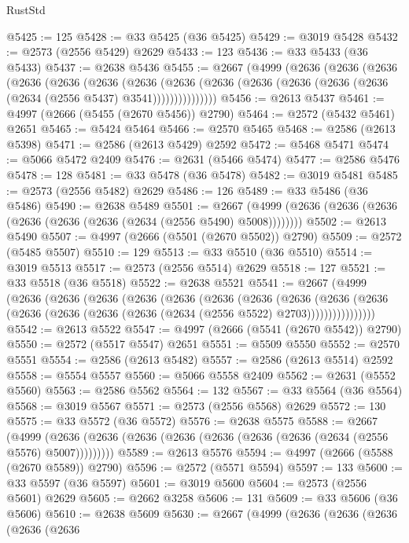 \begin{lexlean}{RustStd}
\begin{coremodule}
@5425 := 125
@5428 := @33 @5425 (@36 @5425)
@5429 := @3019 @5428
@5432 := @2573 (@2556 @5429) @2629
@5433 := 123
@5436 := @33 @5433 (@36 @5433)
@5437 := @2638 @5436
@5455 := @2667
    (@4999
      (@2636
        (@2636
          (@2636
            (@2636
              (@2636
                (@2636
                  (@2636
                    (@2636
                      (@2636 (@2636 (@2636 (@2636 (@2636 (@2634 (@2556 @5437) @3541)))))))))))))))
@5456 := @2613 @5437
@5461 := @4997 (@2666 (@5455 (@2670 @5456)) @2790)
@5464 := @2572 (@5432 @5461) @2651
@5465 := @5424 @5464
@5466 := @2570 @5465
@5468 := @2586 (@2613 @5398)
@5471 := @2586 (@2613 @5429) @2592
@5472 := @5468 @5471
@5474 := @5066 @5472 @2409
@5476 := @2631 (@5466 @5474)
@5477 := @2586 @5476
@5478 := 128
@5481 := @33 @5478 (@36 @5478)
@5482 := @3019 @5481
@5485 := @2573 (@2556 @5482) @2629
@5486 := 126
@5489 := @33 @5486 (@36 @5486)
@5490 := @2638 @5489
@5501 := @2667 (@4999 (@2636 (@2636 (@2636 (@2636 (@2636 (@2636 (@2634 (@2556 @5490) @5008))))))))
@5502 := @2613 @5490
@5507 := @4997 (@2666 (@5501 (@2670 @5502)) @2790)
@5509 := @2572 (@5485 @5507)
@5510 := 129
@5513 := @33 @5510 (@36 @5510)
@5514 := @3019 @5513
@5517 := @2573 (@2556 @5514) @2629
@5518 := 127
@5521 := @33 @5518 (@36 @5518)
@5522 := @2638 @5521
@5541 := @2667
    (@4999
      (@2636
        (@2636
          (@2636
            (@2636
              (@2636
                (@2636
                  (@2636
                    (@2636
                      (@2636
                        (@2636
                          (@2636 (@2636 (@2636 (@2636 (@2634 (@2556 @5522) @2703))))))))))))))))
@5542 := @2613 @5522
@5547 := @4997 (@2666 (@5541 (@2670 @5542)) @2790)
@5550 := @2572 (@5517 @5547) @2651
@5551 := @5509 @5550
@5552 := @2570 @5551
@5554 := @2586 (@2613 @5482)
@5557 := @2586 (@2613 @5514) @2592
@5558 := @5554 @5557
@5560 := @5066 @5558 @2409
@5562 := @2631 (@5552 @5560)
@5563 := @2586 @5562
@5564 := 132
@5567 := @33 @5564 (@36 @5564)
@5568 := @3019 @5567
@5571 := @2573 (@2556 @5568) @2629
@5572 := 130
@5575 := @33 @5572 (@36 @5572)
@5576 := @2638 @5575
@5588 := @2667
    (@4999 (@2636 (@2636 (@2636 (@2636 (@2636 (@2636 (@2636 (@2634 (@2556 @5576) @5007)))))))))
@5589 := @2613 @5576
@5594 := @4997 (@2666 (@5588 (@2670 @5589)) @2790)
@5596 := @2572 (@5571 @5594)
@5597 := 133
@5600 := @33 @5597 (@36 @5597)
@5601 := @3019 @5600
@5604 := @2573 (@2556 @5601) @2629
@5605 := @2662 @3258
@5606 := 131
@5609 := @33 @5606 (@36 @5606)
@5610 := @2638 @5609
@5630 := @2667
    (@4999
      (@2636
        (@2636
          (@2636
            (@2636
              (@2636

\end{coremodule}
\end{lexlean}
